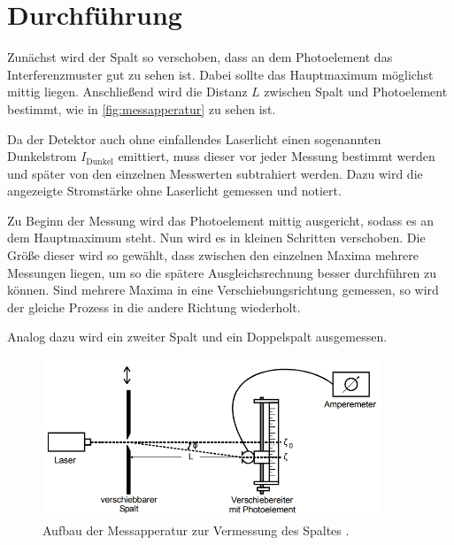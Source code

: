 \section{Durchführung}
\label{sec:Durchführung}

Zunächst wird der Spalt so verschoben, dass an dem Photoelement das Interferenzmuster gut zu sehen ist.
Dabei sollte das Hauptmaximum möglichst mittig liegen.
Anschließend wird die Distanz $L$ zwischen Spalt und Photoelement bestimmt, wie in \autoref{fig:messapperatur} zu sehen ist.

Da der Detektor auch ohne einfallendes Laserlicht einen sogenannten Dunkelstrom $I_\text{Dunkel}$ emittiert, muss dieser vor jeder Messung bestimmt werden und später von den einzelnen Messwerten subtrahiert werden.
Dazu wird die angezeigte Stromstärke ohne Laserlicht gemessen und notiert.

Zu Beginn der Messung wird das Photoelement mittig ausgericht, sodass es an dem Hauptmaximum steht.
Nun wird es in kleinen Schritten verschoben. Die Größe dieser wird so gewählt, dass zwischen den einzelnen Maxima mehrere Messungen liegen, um so die spätere Ausgleichsrechnung besser durchführen zu können.
Sind mehrere Maxima in eine Verschiebungsrichtung gemessen, so wird der gleiche Prozess in die andere Richtung wiederholt.

Analog dazu wird ein zweiter Spalt und ein Doppelspalt ausgemessen.


\begin{figure}
    \centering
    \includegraphics[width=0.9\textwidth]{content/messapperatur.png}
    \caption{Aufbau der Messapperatur zur Vermessung des Spaltes \cite{V406}.}
    \label{fig:messapperatur}
\end{figure}
